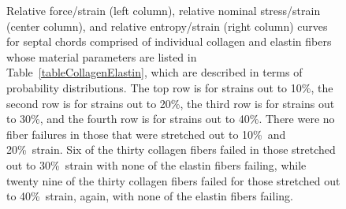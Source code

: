 \begin{figure}
    \caption{Relative force\slash strain (left column), relative nominal stress\slash strain (center column), and relative entropy\slash strain (right column) curves for septal chords comprised of individual collagen and elastin fibers whose material parameters are listed in Table~\ref{tableCollagenElastin}, which are described in terms of probability distributions.  The top row is for strains out to 10\%, the second row is for strains out to 20\%, the third row is for strains out to 30\%, and the fourth row is for strains out to 40\%.  There were no fiber failures in those that were stretched out to 10\%\ and 20\%\ strain.  Six of the thirty collagen fibers failed in those stretched out to 30\%\ strain with none of the elastin fibers failing, while twenty nine of the thirty collagen fibers failed for those stretched out to 40\%\ strain, again, with none of the elastin fibers failing.}
    \label{figStressStrainFibers}
\end{figure}

